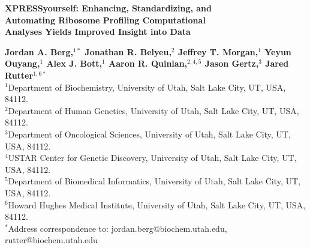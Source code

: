 \documentclass[10pt, oneside]{article}
\date{}
\begin{document}
\baselineskip24pt

\noindent
{\huge
\textbf{XPRESSyourself: Enhancing, Standardizing, and \\
Automating Ribosome Profiling Computational \\
Analyses Yields Improved Insight into Data
}
}

\bigskip




\noindent
{\large
\textbf{Jordan A. Berg,$^{1\ast}$ Jonathan R. Belyeu,$^{2}$ Jeffrey T. Morgan,$^{1}$ Yeyun Ouyang,$^{1}$ Alex J. Bott,$^{1}$ Aaron R. Quinlan,$^{2,4,5}$ Jason Gertz,$^{3}$ Jared Rutter$^{1,6\ast}$
}
} \\

\noindent
{$^{1}$Department of Biochemistry, University of Utah, Salt Lake City, UT, USA, 84112.}\\
{$^{2}$Department of Human Genetics, University of Utah, Salt Lake City, UT, USA, 84112.}\\
{$^{3}$Department of Oncological Sciences, University of Utah, Salt Lake City, UT, USA, 84112.}\\
{$^{4}$USTAR Center for Genetic Discovery, University of Utah, Salt Lake City, UT, USA, 84112.}\\
{$^{5}$Department of Biomedical Informatics, University of Utah, Salt Lake City, UT, USA, 84112.}\\
{$^{6}$Howard Hughes Medical Institute, University of Utah, Salt Lake City, UT, USA, 84112.}\\
{$^\ast$Address correspondence to: jordan.berg@biochem.utah.edu, rutter@biochem.utah.edu}

\pagebreak

\end{document}
